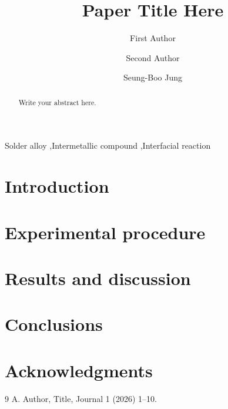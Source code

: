 \documentclass[review]{elsarticle}
\begin{document}
\begin{frontmatter}

\title{Paper Title Here}

\author[skku]{First Author}
\author[skku]{Second Author}
\author[skku]{Seung-Boo Jung}

\begin{abstract}
Write your abstract here.
\end{abstract}

\begin{keyword}
Solder alloy \sep Intermetallic compound \sep Interfacial reaction
\end{keyword}

\end{frontmatter}

\section{Introduction}

\section{Experimental procedure}

\section{Results and discussion}

\section{Conclusions}

\section*{Acknowledgments}

\begin{thebibliography}{9}
 A. Author, Title, Journal 1 (2026) 1--10.
\end{thebibliography}
\end{document}
